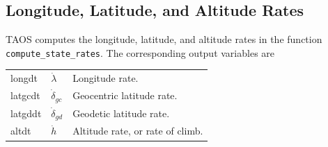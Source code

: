 \subsection{Longitude, Latitude, and Altitude Rates}\label{sec:position-rates}

TAOS computes the longitude, latitude, and altitude rates in the function
\texttt{compute\_state\_rates}. The corresponding output variables are
\begin{longtable}{@{}>{\ttfamily}p{}p{}p{}@{}}
  longdt  & $\dot\lambda$ & Longitude rate.\\
  latgcdt & $\dot\delta_{gc}$ & Geocentric latitude rate.\\
  latgddt & $\dot\delta_{gd}$ & Geodetic latitude rate.\\
  altdt   & $\dot h$ & Altitude rate, or rate of climb.\\
\end{longtable}


